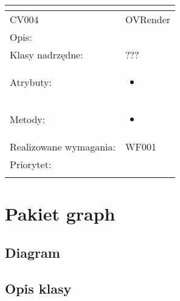\documentclass[a4paper,10pt]{article}
\begin{document}
\begin{center}
\begin{longtable}{|m{3cm}|m{9cm}|}
\multicolumn{2}{c}{} \\
 \hline

CV004 & OVRender \\ \hline
Opis: &     \\ \hline
Klasy nadrzędne: &  ???   \\ \hline
Atrybuty: & \begin{itemize}
 \item 
\end{itemize}
 \\ \hline
Metody: & \begin{itemize}
 \item 
\end{itemize}
  \\ \hline
Realizowane wymagania: & WF001 \\ \hline
Priorytet: &  \\ \hline

\multicolumn{2}{c}{} \\
 \hline


\end{longtable}

\end{center}

\section{Pakiet graph}

\subsection{Diagram}

\subsection{Opis klasy}
\end{document}
